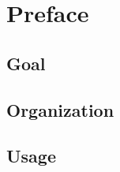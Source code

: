 \chapter*{Preface}\label{chapter:preface}

\section*{Goal}
\section*{Organization}
\section*{Usage}
